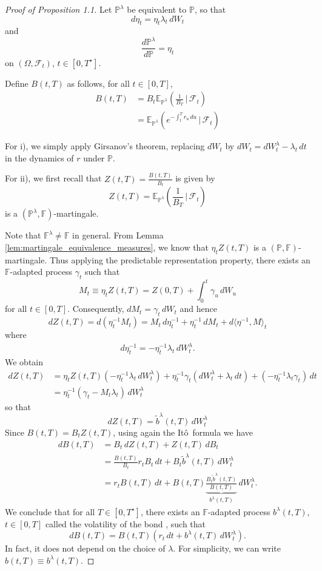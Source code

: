 \documentclass[10pt, oneside, reqno]{amsbook}
\theoremstyle{plain}%
\theoremstyle{definition}
\theoremstyle{remark}
\newcommand{\given}{ \, | \,}
\newcommand{\sigf}{\mathcal{F}}
\newcommand{\E}{\mathbb{E}}
\renewcommand{\P}{\mathbb{P}}
\newcommand{\F}{\mathbb{F}}
\newcommand{\ito}{It\^o\ }
\numberwithin{equation}{chapter}
\begin{document}
\begin{proof}[Proof of Proposition 1.1]
	Let $\P^\lambda$ be equivalent to $\P$, so that \[
		d\eta_t = \eta_t \lambda_t \, dW_t
	\]  and \[
		\frac{d\P^\lambda}{d \P} = \eta_t
	\] on $(\Omega, \sigf_t)$, $t \in [0, T^\star]$.

	Define $B(t, T)$ as follows, for all $t \in [0, T]$, \begin{align*}
		B(t, T) &= B_t \E_{\P^\lambda} \left( \frac{1}{B_T} \given \sigf_t \right) \\
		&= \E_{\P^\lambda} \left(e^{-\int_t^T r_u \, du} \given \sigf_t \right)
	\end{align*}
	
	For i), we simply apply Girsanov's theorem, replacing $dW_t$ by $dW_t = dW^\lambda_t - \lambda_t \, dt$ in the dynamics of $r$ under $\P$.  
	
	For ii), we first recall that $Z(t, T) = \frac{B(t, T)}{B_t}$ is given by \[
		Z(t, T) = \E_{\P^\lambda} \left( \frac{1}{B_T} \given \sigf_t \right)
	\] is a $(\P^\lambda, \F)$-martingale.
	
	Note that $\F^{\lambda} \neq \F$ in general.  From Lemma \ref{lem:martingale_equivalence_measures}, we know that $\eta_t Z(t, T)$ is a $(\P, \F)$-martingale.  Thus applying the predictable representation property, there exists an $\F$-adapted process $\gamma_t$ such that \[
		M_t \equiv \eta_t Z(t, T) = Z(0, T) + \int_0^t \gamma_u \, dW_u
	\] for all $t \in [0, T]$.  Consequently, $dM_t = \gamma_t \, dW_t$ and hence \[
		dZ(t, T) = d(\eta^{-1}_t M_t) = M_t \, d\eta_t^{-1} + \eta_t^{-1}\, dM_t + d \langle \eta^{-1}, M \rangle_t
	\]  where \begin{align*}
		d \eta_t^{-1} = - \eta_t^{-1} \lambda_t \, dW_t^\lambda.
	\end{align*}  We obtain \begin{align*}
		dZ(t, T) &= \eta_t Z(t, T) \left( - \eta_t^{-1} \lambda_t \, dW_t^\lambda \right) + \eta_t^{-1} \gamma_t \left(dW_t^\lambda + \lambda_t \, dt \right) + \left(- \eta_t^{-1} \lambda_t \gamma_t \right) \, dt \\
		&= \eta_t^{-1} \left(\gamma_t - M_t \lambda_t \right) \, dW_t^\lambda
	\end{align*} so that \[
		dZ(t, T) = \tilde b^\lambda(t, T) \, dW_t^\lambda
	\]  Since $B(t, T) = B_t Z(t, T)$, using again the \ito formula we have \begin{align*}
		dB(t, T) 	&= B_t \, dZ(t, T) + Z(t, T) \, dB_t  \\
					&= \frac{B(t, T)}{B_t} r_t B_t \, dt + B_t \tilde b^\lambda(t, T) \, dW_t^\lambda \\
					&= r_t B(t, T) \, dt + B(t, T) \underbrace{\frac{B_t \tilde b^\lambda(t, T)}{B(t, T)}}_{b^\lambda(t, T)} \, dW^\lambda_t.
	\end{align*}   We conclude that for all $T \in [0, T^\star]$, there exists an $\F$-adapted process $b^\lambda(t, T)$, $t \in [0, T]$ called the volatility of the bond
, such that \[
	dB(t, T) = B(t, T)(r_t \, dt + b^\lambda(t, T) \, dW^\lambda_t).  
\]	  In fact, it does not depend on the choice of $\lambda$.  For simplicity, we can write $b(t, T) \equiv b^\lambda(t, T)$.  


\end{proof}
\end{document}
